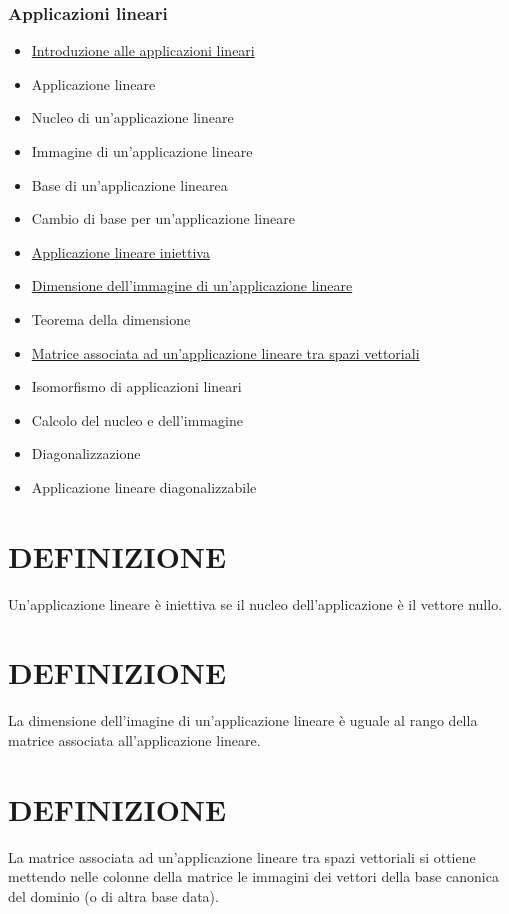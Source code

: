 \subsubsection{Applicazioni lineari}
  \begin{itemize}
   \item \href{IntroAppLineari.pdf}{Introduzione alle applicazioni lineari}
   \item Applicazione lineare
   \item Nucleo di un'applicazione lineare
   \item Immagine di un'applicazione lineare
   \item Base di un'applicazione linearea
   \item Cambio di base per un'applicazione lineare
   \item \href{ApplicazioneIniettiva.pdf}{Applicazione lineare iniettiva}
   \item \href{DimensioneImmagine.pdf}{Dimensione dell'immagine di un'applicazione lineare}
   \item Teorema della dimensione
   \item \href{MatriceApplicazione.pdf}{Matrice associata ad un'applicazione lineare tra spazi vettoriali}
   \item Isomorfismo di applicazioni lineari
   \item Calcolo del nucleo e dell'immagine
   \item Diagonalizzazione
   \item Applicazione lineare diagonalizzabile
  \end{itemize}


\section{DEFINIZIONE}
Un'applicazione lineare è iniettiva se il nucleo dell'applicazione è il vettore nullo.



\section{DEFINIZIONE}
La dimensione dell'imagine di un'applicazione lineare è uguale al rango 
della matrice associata all'applicazione lineare.



\section{DEFINIZIONE}
La matrice associata ad un'applicazione lineare tra spazi vettoriali si ottiene mettendo nelle colonne della matrice
le immagini dei vettori della base canonica del dominio (o di altra base data).


